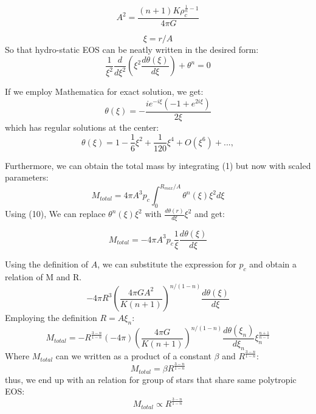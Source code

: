 \documentclass{article}
\begin{document}
\begin{equation}
    A^2 = \frac{(n+1)K\rho_c^{\frac{1}{n} -1}}{4 \pi G}
\end{equation}

\begin{equation}
    \xi = r/A
\end{equation}
So that hydro-static EOS can be neatly written in the desired form:
\begin{equation}
    \frac{1}{\xi^2}\frac{d}{d\xi^2}(\xi^2\frac{d\theta(\xi)}{d\xi}) + \theta^n = 0
\end{equation}

If we employ Mathematica for exact solution, we get:
\begin{equation}
    \theta(\xi) = -\frac{i e^{-i \xi} \left(-1+e^{2 i \xi}\right)}{2 \xi}
\end{equation}
which has regular solutions at the center:
\begin{equation}
    \theta(\xi) = 1 - \frac{1}{6}\xi^2 + \frac{1}{120}\xi^4 + O(\xi^6) + ... ,
\end{equation}

Furthermore, we can obtain the total mass by integrating (1) but now with scaled parameters:
\begin{equation}
    M_{total} = 4\pi A^3p_c\int_{0}^{R_{max}/A}\theta^n(\xi)\xi^2d\xi
\end{equation}
Using (10), We can replace $\theta^n(\xi) \xi^2$ with $\frac{d\theta(r)}{d\xi}\xi^2$ and get:

\begin{equation}
    M_{total} = -4\pi A^3p_c\frac{1}{\xi}\frac{d\theta(\xi)}{d\xi}
\end{equation}

Using the definition of $A$, we can substitute the expression for $p_c$ and obtain a relation of M and R.
\begin{equation}
    -4\pi R^3(\frac{4\pi G A^2}{K(n+1)})^{n/(1-n)}\frac{d\theta(\xi)}{d\xi}
\end{equation}
Employing the definition $R = A\xi_n$:
\begin{equation}
    M_{total} = -R^{\frac{3-n}{1-n}} (-4\pi)(\frac{4\pi G}{K(n+1)})^{n/(1-n)}\frac{d\theta(\xi_n)}{d\xi_n}\xi_n^{\frac{n+1}{n-1}}
\end{equation}
Where $M_{total}$ can we written as a product of a constant $\beta$ and $R^{\frac{3-n}{1-n}}$:
\begin{equation}
    M_{total} = \beta R^{\frac{3-n}{1-n}}
\end{equation}
thus, we end up with an relation for group of stars that share same polytropic EOS:
\begin{equation}
    M_{total} \propto R^{\frac{3-n}{1-n}}
\end{equation}
\end{document}
